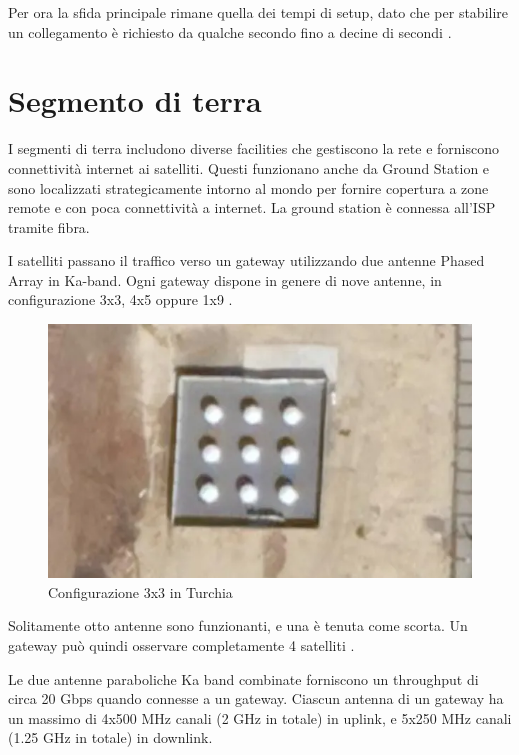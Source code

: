 Per ora la sfida principale rimane quella dei tempi di setup, dato che per stabilire un collegamento è richiesto da qualche secondo fino a decine di secondi \cite{chaudhry_laser_2021}.

\section{Segmento di terra}
I segmenti di terra includono diverse facilities che gestiscono la rete e forniscono connettività internet ai satelliti. Questi funzionano anche da Ground Station e sono localizzati strategicamente intorno al mondo per fornire copertura a zone remote e con poca connettività a internet.
La ground station è connessa all'\ac{ISP} tramite fibra.\cite{branch_education_how_2022}

I satelliti passano il traffico verso un gateway utilizzando due antenne Phased Array in \ac{Ka}-band. Ogni gateway dispone in genere di nove antenne, in configurazione 3x3, 4x5 oppure 1x9 \cite{mike_puchol_modeling_2022}.

\begin{figure}[htbp]
  \centering
  \includegraphics[width=0.9\linewidth]{./res/img/starlink_gateway.png}
  \caption{Configurazione 3x3 in Turchia \cite{mike_puchol_modeling_2022}}
  \label{fig:starlink-gateway}
\end{figure}

Solitamente otto antenne sono funzionanti, e una è tenuta come scorta.
Un gateway può quindi osservare completamente 4 satelliti \cite{mike_puchol_modeling_2022}.

Le due antenne paraboliche \ac{Ka} band combinate forniscono un throughput di circa 20 Gbps quando connesse a un gateway.
Ciascun antenna di un gateway ha un massimo di 4x500 MHz canali (2 GHz in totale) in uplink, e 5x250 MHz canali (1.25 GHz in totale) in downlink.

